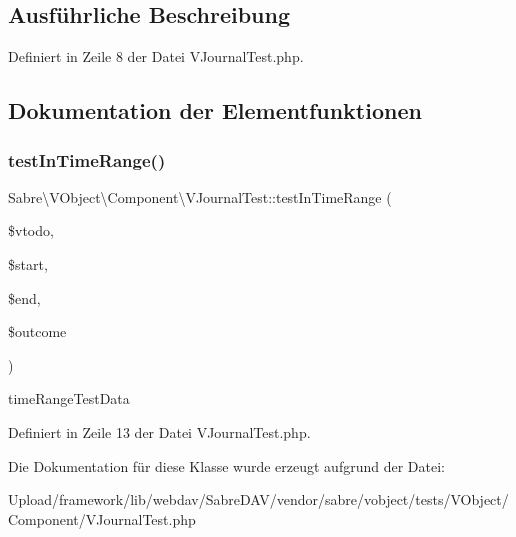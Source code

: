 \subsection{Ausführliche Beschreibung}


Definiert in Zeile 8 der Datei V\+Journal\+Test.\+php.



\subsection{Dokumentation der Elementfunktionen}
\mbox{\label{class_sabre_1_1_v_object_1_1_component_1_1_v_journal_test_a9990d4a50be53ce548ff038dce94acd3}} 
\subsubsection{\texorpdfstring{test\+In\+Time\+Range()}{testInTimeRange()}}
{\footnotesize\ttfamily Sabre\textbackslash{}\+V\+Object\textbackslash{}\+Component\textbackslash{}\+V\+Journal\+Test\+::test\+In\+Time\+Range (\begin{DoxyParamCaption}\item[{\mbox{\hyperlink{class_sabre_1_1_v_object_1_1_component_1_1_v_journal}{V\+Journal}}}]{\$vtodo,  }\item[{}]{\$start,  }\item[{}]{\$end,  }\item[{}]{\$outcome }\end{DoxyParamCaption})}

time\+Range\+Test\+Data 

Definiert in Zeile 13 der Datei V\+Journal\+Test.\+php.



Die Dokumentation für diese Klasse wurde erzeugt aufgrund der Datei\+:\begin{DoxyCompactItemize}
\item 
Upload/framework/lib/webdav/\+Sabre\+D\+A\+V/vendor/sabre/vobject/tests/\+V\+Object/\+Component/V\+Journal\+Test.\+php\end{DoxyCompactItemize}
